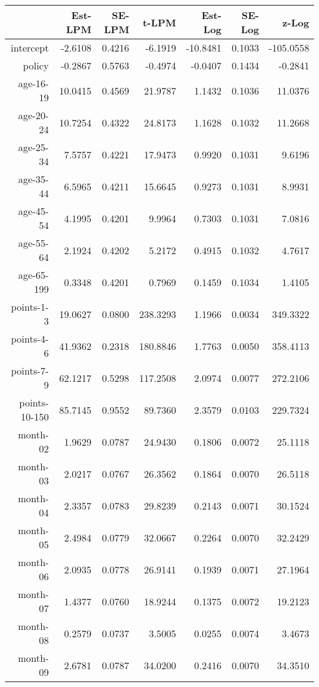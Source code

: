 \documentclass[10pt]{article}
\begin{document}
\begin{table}[ht]
\centering
\begin{tabular}{rrrrrrr}
  \hline
 & Est-LPM & SE-LPM & t-LPM & Est-Log & SE-Log & z-Log \\ 
  \hline
intercept & -2.6108 & 0.4216 & -6.1919 & -10.8481 & 0.1033 & -105.0558 \\ 
  policy & -0.2867 & 0.5763 & -0.4974 & -0.0407 & 0.1434 & -0.2841 \\ 
  age-16-19 & 10.0415 & 0.4569 & 21.9787 & 1.1432 & 0.1036 & 11.0376 \\ 
  age-20-24 & 10.7254 & 0.4322 & 24.8173 & 1.1628 & 0.1032 & 11.2668 \\ 
  age-25-34 & 7.5757 & 0.4221 & 17.9473 & 0.9920 & 0.1031 & 9.6196 \\ 
  age-35-44 & 6.5965 & 0.4211 & 15.6645 & 0.9273 & 0.1031 & 8.9931 \\ 
  age-45-54 & 4.1995 & 0.4201 & 9.9964 & 0.7303 & 0.1031 & 7.0816 \\ 
  age-55-64 & 2.1924 & 0.4202 & 5.2172 & 0.4915 & 0.1032 & 4.7617 \\ 
  age-65-199 & 0.3348 & 0.4201 & 0.7969 & 0.1459 & 0.1034 & 1.4105 \\ 
  points-1-3 & 19.0627 & 0.0800 & 238.3293 & 1.1966 & 0.0034 & 349.3322 \\ 
  points-4-6 & 41.9362 & 0.2318 & 180.8846 & 1.7763 & 0.0050 & 358.4113 \\ 
  points-7-9 & 62.1217 & 0.5298 & 117.2508 & 2.0974 & 0.0077 & 272.2106 \\ 
  points-10-150 & 85.7145 & 0.9552 & 89.7360 & 2.3579 & 0.0103 & 229.7324 \\ 
  month-02 & 1.9629 & 0.0787 & 24.9430 & 0.1806 & 0.0072 & 25.1118 \\ 
  month-03 & 2.0217 & 0.0767 & 26.3562 & 0.1864 & 0.0070 & 26.5118 \\ 
  month-04 & 2.3357 & 0.0783 & 29.8239 & 0.2143 & 0.0071 & 30.1524 \\ 
  month-05 & 2.4984 & 0.0779 & 32.0667 & 0.2264 & 0.0070 & 32.2429 \\ 
  month-06 & 2.0935 & 0.0778 & 26.9141 & 0.1939 & 0.0071 & 27.1964 \\ 
  month-07 & 1.4377 & 0.0760 & 18.9244 & 0.1375 & 0.0072 & 19.2123 \\ 
  month-08 & 0.2579 & 0.0737 & 3.5005 & 0.0255 & 0.0074 & 3.4673 \\ 
  month-09 & 2.6781 & 0.0787 & 34.0200 & 0.2416 & 0.0070 & 34.3510 \\ 

\end{tabular}
\end{table}
\end{document}
